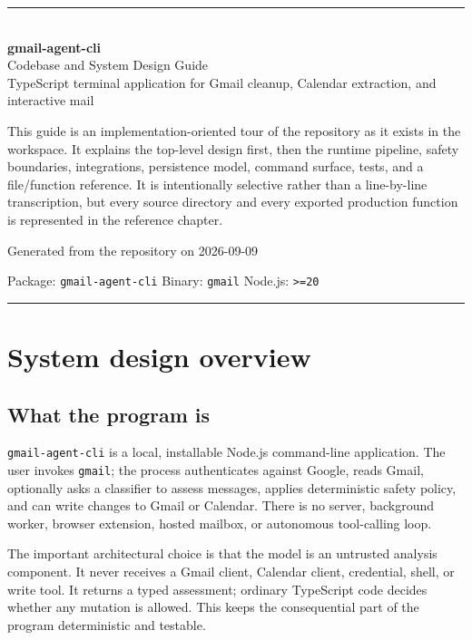 \documentclass[12pt,oneside]{book}
\newcommand{\code}[1]{\nolinkurl{#1}}
\newcommand{\term}[1]{\texttt{#1}}
\begin{document}
\begin{titlepage}
  \centering
  \vspace*{1.1cm}
  {\color{accent}\rule{\textwidth}{1.2pt}}\\[1.1cm]
  {\Huge\bfseries\color{ink} gmail-agent-cli\\[0.25cm]}
  {\LARGE Codebase and System Design Guide\\[0.8cm]}
  {\large TypeScript terminal application for Gmail cleanup, Calendar extraction, and interactive mail}\\[1.4cm]
  \begin{minipage}{0.86\textwidth}
  \small
  This guide is an implementation-oriented tour of the repository as it exists in the workspace. It explains the top-level design first, then the runtime pipeline, safety boundaries, integrations, persistence model, command surface, tests, and a file/function reference. It is intentionally selective rather than a line-by-line transcription, but every source directory and every exported production function is represented in the reference chapter.
  \end{minipage}
  \vfill
  {\large Generated from the repository on 2026-09-09}\par
  {\small Package: \code{gmail-agent-cli} \quad Binary: \code{gmail} \quad Node.js: \code{>=20}}\par
  \vspace{0.4cm}
  {\color{accent}\rule{\textwidth}{1.2pt}}
\end{titlepage}

\frontmatter
\tableofcontents
\mainmatter

\chapter{System design overview}

\section{What the program is}

\code{gmail-agent-cli} is a local, installable Node.js command-line application. The user invokes \term{gmail}; the process authenticates against Google, reads Gmail, optionally asks a classifier to assess messages, applies deterministic safety policy, and can write changes to Gmail or Calendar. There is no server, background worker, browser extension, hosted mailbox, or autonomous tool-calling loop.

The important architectural choice is that the model is an untrusted analysis component. It never receives a Gmail client, Calendar client, credential, shell, or write tool. It returns a typed assessment; ordinary TypeScript code decides whether any mutation is allowed. This keeps the consequential part of the program deterministic and testable.
\end{document}
